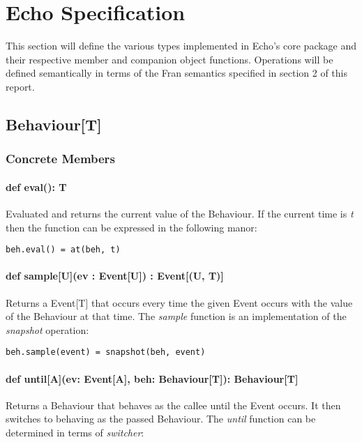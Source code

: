 \chapter{Echo Specification}

  This section will define the various types implemented in Echo's core package and their
  respective member and companion object functions. Operations will be defined 
  semantically in terms of the Fran semantics specified in section 2 of this report.

  \section*{Behaviour[T]}
    \subsection*{Concrete Members}
    \subsubsection*{def eval(): T}
      Evaluated and returns the current value of the
      Behaviour. If the current time is \emph{t} then the
      function can be expressed in the following manor:

\begin{verbatim}
beh.eval() = at(beh, t)
\end{verbatim}      
    
    \subsubsection*{def sample[U](ev : Event[U]) : Event[(U, T)]}
      Returns a Event[T] that occurs every time the given
      Event occurs with the value of the Behaviour at that time.
      The \emph{sample} function is an implementation of the \emph{snapshot} operation:
      
\begin{verbatim}
beh.sample(event) = snapshot(beh, event)
\end{verbatim}
    
    \subsubsection*{def until[A](ev: Event[A], beh: Behaviour[T]): Behaviour[T]}
      Returns a Behaviour that behaves as the callee until the
      Event occurs. It then switches to behaving as the passed
      Behaviour. The \emph{until} function can be determined in terms
      of \emph{switcher}:

